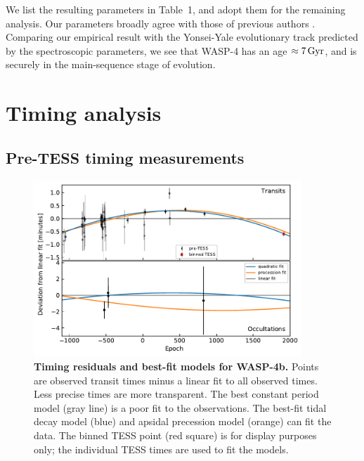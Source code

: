 \documentclass[12pt,twocolumn,tighten]{aastex62}
\begin{document}
We list the resulting parameters in Table~1, and adopt them for the
remaining analysis.  Our parameters broadly agree with those of previous
authors
\citep{wilson_wasp-4b_2008,gillon_discovery_2009,winn_transit_2009,southworth_homogeneous_2011,petrucci_no_2013}.
Comparing our empirical result with the Yonsei-Yale evolutionary track
predicted by the spectroscopic parameters, we see that WASP-4 has an
age $\approx 7\,{\rm Gyr}$, and is securely in the main-sequence stage
of evolution.

\section{Timing analysis}
\label{sec:timing}

\subsection{Pre-TESS timing measurements}
\label{subsec:times}

\begin{figure}[t]
    \begin{center}
        \leavevmode
        \includegraphics[width=0.9\textwidth]{f4.pdf}
    \end{center}
    \vspace{-0.5cm}
    \caption{
        {\bf Timing residuals and best-fit models for WASP-4b.}
        Points are observed transit times minus a linear fit to all
        observed times.  Less precise times are more transparent.  The
        best constant period model (gray line) is a poor fit to the
        observations.  The best-fit tidal decay model (blue) and
        apsidal precession model (orange) can fit the data.  The
        binned TESS point (red square) is for display purposes only;
        the individual TESS times are used to fit the models.
        \label{fig:times}
    }
\end{figure}
\end{document}
